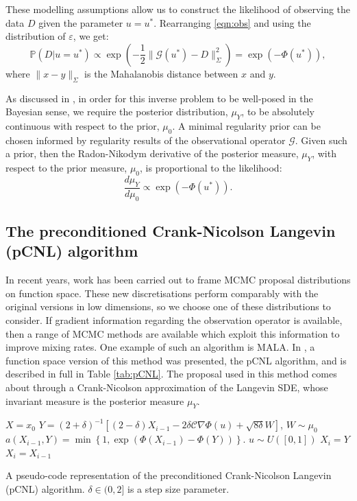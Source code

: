 \documentclass[final]{siamltex}
\newcommand{\data}{D}
\begin{document}
These modelling assumptions allow us to construct the 
likelihood of observing the data $\data$ given the parameter $u =
u^*$. Rearranging \eqref{eqn:obs} and using the distribution of $\varepsilon$, we get:
\begin{equation}\label{eqn:like}
	\mathbb{P}(\data|u=u^*) \propto \exp \left ( -\frac{1}{2} \|\mathcal{G}(u^*)
	  - \data\|_\Sigma^2 \right ) = \exp\left(-\Phi(u^*)\right),
\end{equation}
where $\| x - y \|_\Sigma$ is the Mahalanobis distance between $x$ and $y$.

As discussed in \cite{stuart2010inverse,cotter2009bayesian},
in order for this inverse problem to be well-posed in the Bayesian
sense, we require the posterior distribution, $\mu_Y$, to be absolutely
continuous with respect to the prior, $\mu_0$. A
minimal regularity prior can be chosen informed by regularity results
of the observational operator $\mathcal{G}$. Given such a prior, then
the Radon-Nikodym derivative of the posterior measure, $\mu_Y$, with
respect to the prior measure, $\mu_0$, is proportional to the
likelihood:
\begin{equation}\label{eqn:RND}
	\frac{d\mu_Y}{d\mu_0} \propto \exp \left ( -\Phi(u^*) \right ).
\end{equation}

\subsection{The preconditioned Crank-Nicolson Langevin (pCNL) algorithm}
In recent years, work has been carried out to frame MCMC proposal
distributions on function space\cite{cotter2013mcmc}. These new
discretisations perform comparably with the original versions in low
dimensions, so we choose one of these distributions to consider. If gradient information regarding the observation operator is
available, then a range of MCMC methods are available which exploit this information to improve mixing rates. One
example of such an algorithm is MALA. In \cite{cotter2013mcmc}, a function space version of this
method was presented, the pCNL algorithm, and is described in full in Table
\ref{tab:pCNL}. The proposal used in this method comes about through
a Crank-Nicolson approximation of the Langevin SDE, whose invariant
measure is the posterior measure $\mu_Y$.

\begin{table}
\begin{mdframed}
\begin{algorithmic}
\STATE $X = x_0$
\STATE $Y = (2+\delta)^{-1}\left[(2 - \delta)X_{i-1}-
2\delta\mathcal{C}\nabla \Phi(u)+
\sqrt{8\delta} W\right] $, $W \sim \mu_0$
\STATE $a(X_{i-1},Y) = \min \left \{ 1,  \exp(\Phi(X_{i-1}) - \Phi(Y) ) \right \}$.
\STATE $u \sim U([0,1])$
\STATE $X_i = Y$
\ELSE 
\STATE $X_i = X_{i-1}$
\ENDIF
\ENDFOR
\end{algorithmic}
\end{mdframed}\caption{A pseudo-code representation of the preconditioned Crank-Nicolson Langevin
   (pCNL) algorithm. $\delta \in (0,2]$ is a step size parameter.}
\label{tab:pCNL}
\end{table}
\end{document}
